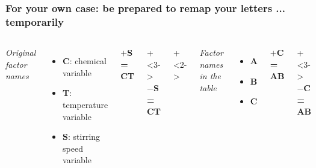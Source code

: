 \begin{frame}\frametitle{For your own case: be prepared to remap your letters ... temporarily}
	\begin{columns}[b]
			\emph{Original factor names}
			
			\begin{itemize}
				\item	\textbf{C}: chemical variable
				\item	\textbf{T}: temperature variable
				\item	\textbf{S}: stirring speed variable
			\end{itemize}
			
			\vspace{1cm}
			\textbf{$+$S = CT}
			
		\onslide+<3->{
			\vspace{1cm}
			\textbf{$-$S = CT}
		}
			
		\onslide+<2->{
			\emph{Factor names in the table}
			
			\begin{itemize}
				\item	\textbf{A}
				\item	\textbf{B}
				\item	\textbf{C}
			\end{itemize}
			
			\vspace{1cm}
			\textbf{$+$C = AB}
		}
		
		\onslide+<3->{	
			\vspace{1cm}
			\textbf{$-$C = AB}
		}
	\end{columns}	
\end{frame}

